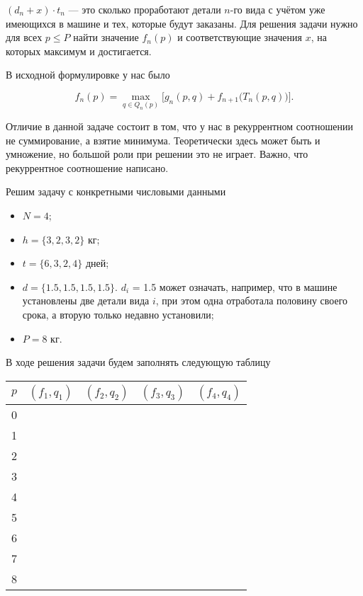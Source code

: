 $(d_n + x) \cdot t_n$ --- это сколько проработают детали $n$-го вида с учётом уже имеющихся в машине и тех, которые будут заказаны. Для решения задачи нужно для всех $p \le P$ найти значение $f_n(p)$ и соответствующие значения $x$, на которых максимум и достигается.

В исходной формулировке у нас было

\[
f_n(p) = \max_{q \in Q_{n}(p)} \Big[g_n(p, q) + f_{n+1}\big(T_{n}(p, q)\big)\Big].
\]

Отличие в данной задаче состоит в том, что у нас в рекуррентном соотношении не суммирование, а взятие минимума. Теоретически здесь может быть и умножение, но большой роли при решении это не играет. Важно, что рекуррентное соотношение написано.

\solution

Решим задачу с конкретными числовыми данными

\begin{itemize}[nosep]
	\item $N = 4$;
	
	\item $h = \{3, 2, 3, 2\}$ кг;
	
	\item $t = \{6, 3, 2, 4\}$ дней;
	
	\item $d = \{1.5, 1.5, 1.5, 1.5\}$. $d_i$ = 1.5 может означать, например, что в машине установлены две детали вида $i$, при этом одна отработала половину своего срока, а вторую только недавно установили;
	
	\item $P = 8$ кг.
\end{itemize}

\bigskip

В ходе решения задачи будем заполнять следующую таблицу

\begin{table}[H]
	\centering
	\begin{tabular}{ | c | c | c | c | c | } 
		\hline
		$p$ & $(f_1, q_1)$ & $(f_2, q_2)$ & $(f_3, q_3)$ & $(f_4, q_4)$ \\ 
		\hline
		0 & & & & \\\hline
		1 & & & & \\\hline
		2 & & & &\\\hline
		3 & & & & \\\hline
		4 & & & & \\\hline
		5 & & & & \\\hline
		6 & & & & \\\hline
		7 & & & & \\\hline
		8 & & & & \\\hline
	\end{tabular}
\end{table}

